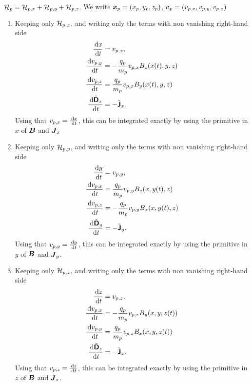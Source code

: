 \documentclass[11pt]{article}
\begin{document}
\begin{enumerate}
          $\mathcal{H}_p = \mathcal{H}_{p,x} + \mathcal{H}_{p,y} + \mathcal{H}_{p,z}$. We write ${\boldsymbol x}_p=(x_p,y_p,z_p)$, ${\boldsymbol v}_p=(v_{p,x},v_{p,y},v_{p,z})$
          \begin{enumerate}
              \item Keeping only $\mathcal{H}_{p,x}$, and writing only the terms with non vanishing right-hand side
                    $$
                        \begin{aligned}
                            \frac{\, {\rm d} x}{\, {\rm d} t}               & = v_{p,x},                                 \\
                            \frac{\, {\rm d} v_{p,y} }{\, {\rm d} t}        & = - \frac {q_p}{m_p} v_{p,x} B_z(x(t),y,z) \\
                            \frac{\, {\rm d} v_{p,z} }{\, {\rm d} t}        & =  \frac {q_p}{m_p} v_{p,x} B_y(x(t),y,z)  \\
                            \frac{\, {\rm d} \tilde{{\boldsymbol {\rm \mathsf{D}}}}_x}{\, {\rm d} t} & =  -\tilde{{\boldsymbol {\rm \mathsf{J}}}}_x.
                        \end{aligned}
                    $$
                    Using that $v_{p,x}=\frac{\, {\rm d} x}{\, {\rm d} t}$, this can be integrated exactly by using the primitive in $x$ of ${\boldsymbol B}$ and ${\boldsymbol J}_x$
              \item Keeping only $\mathcal{H}_{p,y}$, and writing only the terms with non vanishing right-hand side
                    $$
                        \begin{aligned}
                            \frac{\, {\rm d} y}{\, {\rm d} t}               & = v_{p,y},                                 \\
                            \frac{\, {\rm d} v_{p,x} }{\, {\rm d} t}        & = \frac {q_p}{m_p} v_{p,y} B_z(x,y(t),z)   \\
                            \frac{\, {\rm d} v_{p,z} }{\, {\rm d} t}        & = - \frac {q_p}{m_p} v_{p,y} B_x(x,y(t),z) \\
                            \frac{\, {\rm d} \tilde{{\boldsymbol {\rm \mathsf{D}}}}_y}{\, {\rm d} t} & =  -\tilde{{\boldsymbol {\rm \mathsf{J}}}}_y.
                        \end{aligned}
                    $$
                    Using that $v_{p,y}=\frac{\, {\rm d} y}{\, {\rm d} t}$, this can be integrated exactly by using the primitive in $y$ of ${\boldsymbol B}$ and ${\boldsymbol J}_y$.
              \item Keeping only $\mathcal{H}_{p,z}$, and writing only the terms with non vanishing right-hand side
                    $$
                        \begin{aligned}
                            \frac{\, {\rm d} z}{\, {\rm d} t}               & = v_{p,z},                                 \\
                            \frac{\, {\rm d} v_{p,x} }{\, {\rm d} t}        & = - \frac {q_p}{m_p} v_{p,z} B_y(x,y,z(t)) \\
                            \frac{\, {\rm d} v_{p,y} }{\, {\rm d} t}        & =  \frac {q_p}{m_p} v_{p,z} B_x(x,y,z(t))  \\
                            \frac{\, {\rm d} \tilde{{\boldsymbol {\rm \mathsf{D}}}}_z}{\, {\rm d} t} & =  -\tilde{{\boldsymbol {\rm \mathsf{J}}}}_z.
                        \end{aligned}
                    $$
                    Using that $v_{p,z}=\frac{\, {\rm d} z}{\, {\rm d} t}$, this can be integrated exactly by using the primitive in $z$ of ${\boldsymbol B}$ and ${\boldsymbol J}_z$.
          \end{enumerate}

\end{enumerate}
\end{document}

